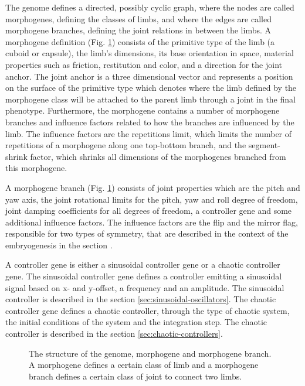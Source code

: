 \documentclass[main]{subfiles}
\begin{document}
The genome defines a directed, possibly cyclic graph, where the nodes are called morphogenes, defining the classes of limbs, and where the edges are called morphogene branches, defining the joint relations in between the limbs. %
%
A morphogene definition (Fig. \ref{figure:genome-structure}) consists of the primitive type of the limb (a cuboid or capsule), the limb's dimensions, its base orientation in space, material properties such as friction, restitution and color, and a direction for the joint anchor. %
%
The joint anchor is a three dimensional vector and represents a position on the surface of the primitive type which denotes where the limb defined by the morphogene class will be attached to the parent limb through a joint in the final phenotype. %
%
Furthermore, the morphogene contains a number of morphogene branches and influence factors related to how the branches are influenced by the limb. %
%
The influence factors are the repetitions limit, which limits the number of repetitions of a morphogene along one top-bottom branch, and the segment-shrink factor, which shrinks all dimensions of the morphogenes branched from this morphogene.

A morphogene branch (Fig. \ref{figure:genome-structure}) consists of joint properties which are the pitch and yaw axis, the joint rotational limits for the pitch, yaw and roll degree of freedom, joint damping coefficients for all degrees of freedom, a controller gene and some additional influence factors. %
%
The influence factors are the flip and the mirror flag, responsible for two types of symmetry, that are described in the context of the embryogenesis in the section \label{subsec:embryogenesis}.

A controller gene is either a sinusoidal controller gene or a chaotic controller gene. %
%
The sinusoidal controller gene defines a controller emitting a sinusoidal signal based on x- and y-offset, a frequency and an amplitude. %
%
The sinusoidal controller is described in the section \ref{sec:sinusoidal-oscillators}. %
%
The chaotic controller gene defines a chaotic controller, through the type of chaotic system, the initial conditions of the system and the integration step. %
%
The chaotic controller is described in the section \ref{sec:chaotic-controllers}.

\begin{figure}[H]
\center


\caption[Indirectly encoded genome structure]{The structure of the genome, morphogene and morphogene branch. A morphogene defines a certain class of limb and a morphogene branch defines a certain class of joint to connect two limbs.}
\label{figure:genome-structure}
\end{figure}
\end{document}
